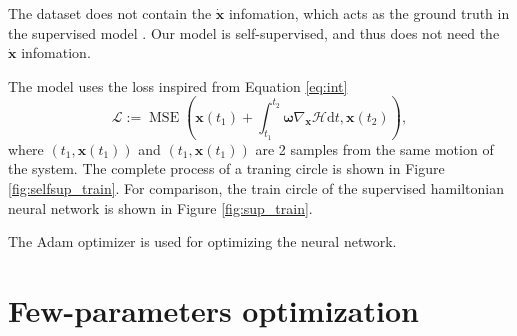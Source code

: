 \documentclass{article}
\begin{document}
The dataset does not contain the $\dot{\mathbf x}$ infomation,
which acts as the ground truth in the supervised model \cite{greydanus2019hamiltonian}.
Our model is self-supervised, and thus does not need the $\dot{\mathbf x}$ infomation.

The model uses the loss inspired from Equation \ref{eq:int}
\begin{equation}
	\mathcal L:=\operatorname{MSE}\left(\mathbf x\left(t_1\right)+\int_{t_1}^{t_2}\boldsymbol\omega\nabla_{\mathbf x}\mathcal H\mathrm dt,\mathbf x\left(t_2\right)\right),
\end{equation}
where $\left(t_1,\mathbf x\left(t_1\right)\right)$ and $\left(t_1,\mathbf x\left(t_1\right)\right)$
are 2 samples from the same motion of the system.
The complete process of a traning circle is shown in Figure \ref{fig:selfsup_train}.
For comparison, the train circle of the supervised hamiltonian neural network
is shown in Figure \ref{fig:sup_train}.

The Adam optimizer \cite{kingma2017adam} is used for optimizing the neural network.

\section{Few-parameters optimization}
\end{document}
